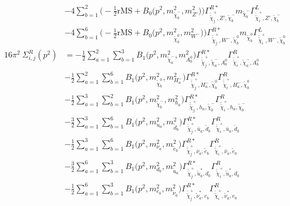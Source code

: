 \begin{itemize}
\begin{align}
 &-4 \sum_{b=1}^{2}\Big(-\frac{1}{2} \text{rMS}  + {B_0\Big(p^{2},m^2_{\tilde{\chi}^-_{{b}}},m^2_{{Z'}}\Big)}\Big){\Gamma^{R*}_{\check{\tilde{\chi}}^+_{{j}},{Z'},\tilde{\chi}^-_{{b}}}} m_{\tilde{\chi}^-_{{b}}} {\Gamma^L_{\check{\tilde{\chi}}^+_{{i}},{Z'},\tilde{\chi}^-_{{b}}}}  \nonumber \\ 
 &-4 \sum_{b=1}^{6}\Big(-\frac{1}{2} \text{rMS}  + {B_0\Big(p^{2},m^2_{\tilde{\chi}^0_{{b}}},m^2_{W^-}\Big)}\Big){\Gamma^{R*}_{\check{\tilde{\chi}}^+_{{j}},W^-,\tilde{\chi}^0_{{b}}}} m_{\tilde{\chi}^0_{{b}}} {\Gamma^L_{\check{\tilde{\chi}}^+_{{i}},W^-,\tilde{\chi}^0_{{b}}}}  \\ 
16\pi^2 \ \Sigma^R_{i,j}(p^2) &= -\frac{1}{2} \sum_{a=1}^{2}\sum_{b=1}^{3}{B_1\Big(p^{2},m^2_{\tilde{\chi}^-_{{a}}},m^2_{A^0_{{b}}}\Big)} {\Gamma^{R*}_{\check{\tilde{\chi}}^+_{{j}},\tilde{\chi}^-_{{a}},A^0_{{b}}}} {\Gamma^R_{\check{\tilde{\chi}}^+_{{i}},\tilde{\chi}^-_{{a}},A^0_{{b}}}}  \nonumber \\ 
 &-\frac{1}{2} \sum_{a=1}^{2}\sum_{b=1}^{6}{B_1\Big(p^{2},m^2_{\tilde{\chi}^0_{{b}}},m^2_{H^-_{{a}}}\Big)} {\Gamma^{R*}_{\check{\tilde{\chi}}^+_{{j}},H^-_{{a}},\tilde{\chi}^0_{{b}}}} {\Gamma^R_{\check{\tilde{\chi}}^+_{{i}},H^-_{{a}},\tilde{\chi}^0_{{b}}}}  \nonumber \\ 
 &-\frac{1}{2} \sum_{a=1}^{3}\sum_{b=1}^{2}{B_1\Big(p^{2},m^2_{\tilde{\chi}^-_{{b}}},m^2_{h_{{a}}}\Big)} {\Gamma^{R*}_{\check{\tilde{\chi}}^+_{{j}},h_{{a}},\tilde{\chi}^-_{{b}}}} {\Gamma^R_{\check{\tilde{\chi}}^+_{{i}},h_{{a}},\tilde{\chi}^-_{{b}}}}  \nonumber \\ 
 &-\frac{3}{2} \sum_{a=1}^{3}\sum_{b=1}^{6}{B_1\Big(p^{2},m^2_{u_{{a}}},m^2_{\tilde{d}_{{b}}}\Big)} {\Gamma^{R*}_{\check{\tilde{\chi}}^+_{{j}},\bar{u}_{{a}},\tilde{d}_{{b}}}} {\Gamma^R_{\check{\tilde{\chi}}^+_{{i}},\bar{u}_{{a}},\tilde{d}_{{b}}}}  \nonumber \\ 
 &-\frac{1}{2} \sum_{a=1}^{3}\sum_{b=1}^{6}{B_1\Big(p^{2},m^2_{\nu_{{a}}},m^2_{\tilde{e}_{{b}}}\Big)} {\Gamma^{R*}_{\check{\tilde{\chi}}^+_{{j}},\bar{\nu}_{{a}},\tilde{e}_{{b}}}} {\Gamma^R_{\check{\tilde{\chi}}^+_{{i}},\bar{\nu}_{{a}},\tilde{e}_{{b}}}}  \nonumber \\ 
 &-\frac{3}{2} \sum_{a=1}^{6}\sum_{b=1}^{3}{B_1\Big(p^{2},m^2_{d_{{b}}},m^2_{\tilde{u}_{{a}}}\Big)} {\Gamma^{R*}_{\check{\tilde{\chi}}^+_{{j}},\tilde{u}^*_{{a}},d_{{b}}}} {\Gamma^R_{\check{\tilde{\chi}}^+_{{i}},\tilde{u}^*_{{a}},d_{{b}}}}  \nonumber \\ 
 &-\frac{1}{2} \sum_{a=1}^{6}\sum_{b=1}^{3}{B_1\Big(p^{2},m^2_{e_{{b}}},m^2_{\tilde{\nu}_{{a}}}\Big)} {\Gamma^{R*}_{\check{\tilde{\chi}}^+_{{j}},\tilde{\nu}^*_{{a}},e_{{b}}}} {\Gamma^R_{\check{\tilde{\chi}}^+_{{i}},\tilde{\nu}^*_{{a}},e_{{b}}}}  \nonumber \\ 

\end{align}
\end{itemize}
